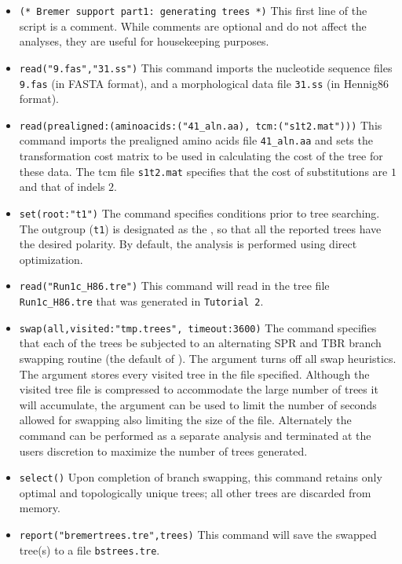 \begin{itemize}
\item \texttt{(* Bremer support part1: generating trees *)} This first line of the script is a comment. While comments
 are optional and do not affect the analyses, they are useful for housekeeping purposes. 
\item \texttt{read("9.fas","31.ss")} This command imports the nucleotide sequence files \texttt{9.fas} (in FASTA 
format), and a morphological data file \texttt{31.ss} (in Hennig86 format).
\item \texttt{read(prealigned:(aminoacids:("41\_aln.aa), tcm:("s1t2.mat")))} This command imports the prealigned
amino acids file \texttt{41\_aln.aa} and sets the transformation cost matrix to be used in calculating the cost of the tree
for these data.  The tcm file \texttt{s1t2.mat} specifies that the cost of substitutions are $1$ and that of indels $2$.
\item \texttt{set(root:"t1")} The  command specifies 
conditions prior to tree searching. The outgroup (\texttt{t1}) is designated as the , so that all the 
reported trees have the desired polarity. By default, the analysis is performed using direct optimization.
\item \texttt{read("Run1c\_H86.tre")} This command will read in the tree file \texttt{Run1c\_H86.tre} that was 
generated in \texttt{Tutorial 2}.
\item \texttt{swap(all,visited:"tmp.trees", timeout:3600)} The  command specifies that each of 
the trees be subjected to an alternating SPR and TBR branch swapping routine (the default of \poy).  The 
 argument turns off all swap heuristics. The  argument stores 
every visited tree in the file specified.  Although the visited tree file is compressed to accommodate the large 
number of trees it will accumulate, the argument  can be used to limit the number of 
seconds allowed for swapping also limiting the size of the file.  Alternately  the   command 
can be performed as a separate analysis and terminated at the users discretion to maximize the number of trees 
generated.
\item \texttt{select()} Upon completion of branch swapping, this command retains only optimal and topologically
 unique trees; all other trees are discarded from memory. 
\item \texttt{report("bremertrees.tre",trees)} This command will save the swapped tree(s) to a file \texttt{bstrees.tre}. 

\end{itemize}
